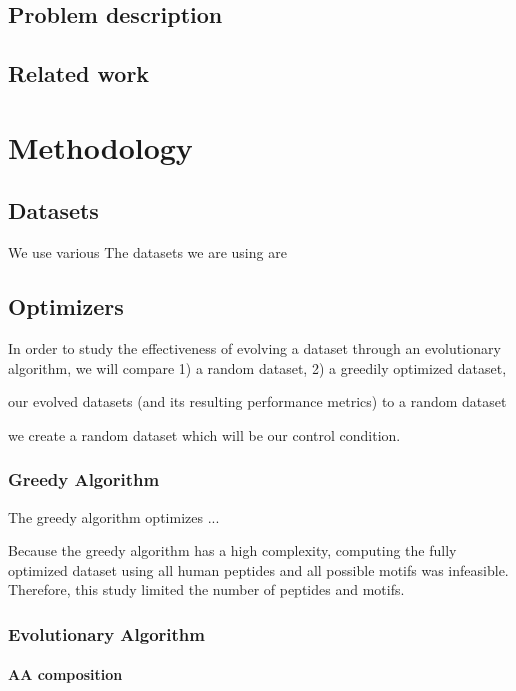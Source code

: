 \documentclass{article}
\begin{document}
\subsection{Problem description}

\subsection{Related work}


\cite{wortel2020t}


\section{Methodology}

\subsection{Datasets} \label{datasets}

We use various 
The datasets we are using are 


\subsection{Optimizers}

In order to study the effectiveness of evolving a dataset through an evolutionary algorithm, we will compare 1) a random
dataset, 2) a greedily optimized dataset, 

our evolved 
datasets (and its resulting performance metrics) to a random dataset

we create a random dataset which will be our control condition.


\subsubsection{Greedy Algorithm}

The greedy algorithm optimizes ...

Because the greedy algorithm has a high complexity, computing the fully optimized dataset using all human peptides and
all possible motifs was infeasible. Therefore, this study limited the number of peptides and motifs.


\subsubsection{Evolutionary Algorithm} 

\paragraph{AA composition}
\end{document}
